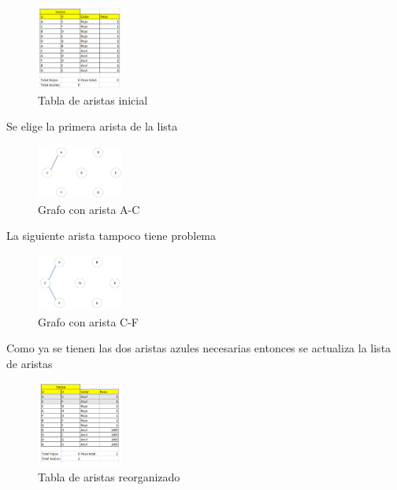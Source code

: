\documentclass[conference,compsoc]{IEEEtran}
\begin{document}
\begin{figure}[h] 
    \centering
    \includegraphics[width=0.25\textwidth]{Problema2/s3.png}
    \caption{Tabla de aristas inicial}
    \label{fig:mesh1}
\end{figure}

$$$$$$$$$$$$$$$$
Se elige la primera arista de la lista
\begin{figure}[h] 
    \centering
    \includegraphics[width=0.25\textwidth]{Problema2/s4.png}
    \caption{Grafo con arista A-C}
    \label{fig:mesh1}
\end{figure}

$$$$
La siguiente arista tampoco tiene problema

\begin{figure}[h] 
    \centering
    \includegraphics[width=0.25\textwidth]{Problema2/s5.png}
    \caption{Grafo con arista C-F}
    \label{fig:mesh1}
\end{figure}

Como ya se tienen las dos aristas azules necesarias entonces se actualiza la lista de aristas

\begin{figure}[h] 
    \centering
    \includegraphics[width=0.25\textwidth]{Problema2/s6.png}
    \caption{Tabla de aristas reorganizado}
    \label{fig:mesh1}
\end{figure}
\end{document}
